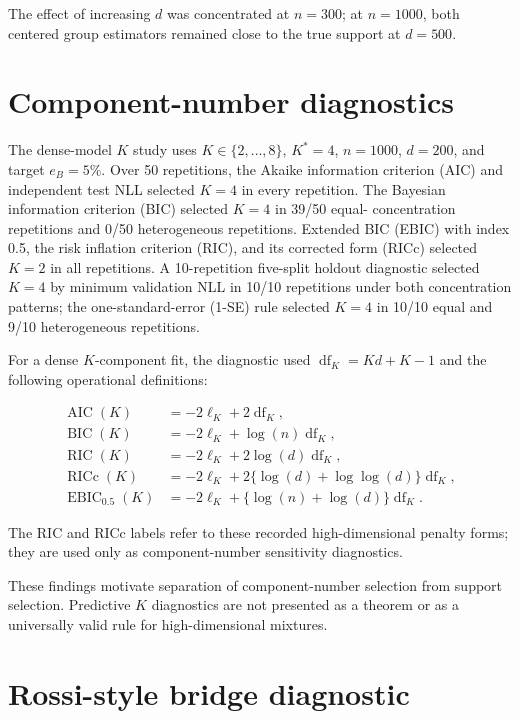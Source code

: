 \documentclass[preprint,12pt,authoryear]{elsarticle}
\begin{document}
The effect of increasing $d$ was concentrated at $n=300$; at $n=1000$, both
centered group estimators remained close to the true support at $d=500$.

\section{Component-number diagnostics}
\label{sec:s-component-number}

The dense-model $K$ study uses $K\in\{2,\ldots,8\}$, $K^\ast=4$, $n=1000$,
$d=200$, and target $e_B=5\%$. Over 50 repetitions, the Akaike information
criterion (AIC) and independent test NLL selected $K=4$ in every repetition.
The Bayesian information criterion (BIC) selected $K=4$ in 39/50 equal-
concentration repetitions and 0/50 heterogeneous repetitions. Extended BIC
(EBIC) with index 0.5, the risk inflation criterion (RIC), and its corrected
form (RICc) selected $K=2$ in all repetitions. A 10-repetition five-split
holdout diagnostic selected $K=4$ by minimum validation NLL in 10/10
repetitions under both concentration patterns; the one-standard-error (1-SE)
rule selected $K=4$
in 10/10 equal and 9/10 heterogeneous repetitions.

For a dense $K$-component fit, the diagnostic used
$\operatorname{df}_K=Kd+K-1$ and the following operational definitions:

\[
\begin{aligned}
\operatorname{AIC}(K)&=-2\ell_K+2\operatorname{df}_K,\\
\operatorname{BIC}(K)&=-2\ell_K+\log(n)\operatorname{df}_K,\\
\operatorname{RIC}(K)&=-2\ell_K+2\log(d)\operatorname{df}_K,\\
\operatorname{RICc}(K)&=-2\ell_K+2\{\log(d)+\log\log(d)\}\operatorname{df}_K,\\
\operatorname{EBIC}_{0.5}(K)&=-2\ell_K+\{\log(n)+\log(d)\}\operatorname{df}_K.
\end{aligned}
\]

The RIC and RICc labels refer to these recorded high-dimensional penalty
forms; they are used only as component-number sensitivity diagnostics.

These findings motivate separation of component-number selection from support
selection. Predictive $K$ diagnostics are not presented as a theorem or as a
universally valid rule for high-dimensional mixtures.

\section{Rossi-style bridge diagnostic}
\label{sec:s-rossi-bridge}
\end{document}
